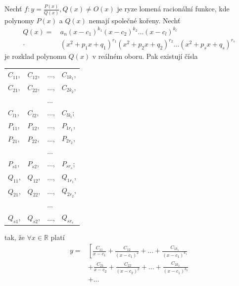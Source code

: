 \begin{veta}\label{rozkladnaparczlomky}
    Nechť $f\colon y=\frac{P(x)}{Q(x)}, Q(x) \ne O(x)$ je ryze lomená
    racionální funkce, kde polynomy $P(x)$ a $Q(x)$ nemají společné
    kořeny. Nechť
    \begin{align*}
        Q(x) = & \, a_n(x-c_1)^{k_1}(x-c_2)^{k_2} \dots
        (x-c_l)^{k_l} \\
        \cdot & \, (x^2+p_1x + q_1)^{r_1}(x^2+p_2x+q_2)
        ^{r_2} \dots (x^2+p_sx+q_s)^{r_s}
    \end{align*}
    je rozklad polynomu $Q(x)$ v reálném oboru. Pak existují čísla
    \begin{center}
        \begin{tabular}{l l l l}
            $C_{11}$, & $C_{12}$, & $\dots$, & $C_{1k_1}$, \\
            $C_{21}$, & $C_{22}$, & $\dots$, & $C_{2k_2}$, \\
            \,        & \,        & $\dots$  & \,          \\
            $C_{l1}$, & $C_{l2}$, & $\dots$, & $C_{lk_l}$; \\
            $P_{11}$, & $P_{12}$, & $\dots$, & $P_{1r_1}$, \\
            $P_{21}$, & $P_{22}$, & $\dots$, & $P_{2r_2}$, \\
            \,        & \,        & $\dots$  & \,          \\
            $P_{s1}$, & $P_{s2}$, & $\dots$, & $P_{sr_s}$; \\
            $Q_{11}$, & $Q_{12}$, & $\dots$, & $Q_{1r_1}$, \\
            $Q_{21}$, & $Q_{22}$, & $\dots$, & $Q_{2r_2}$, \\
            \,        & \,        & $\dots$  & \,          \\
            $Q_{s1}$, & $Q_{s2}$, & $\dots$, & $Q_{sr_s}$
        \end{tabular}
    \end{center}
    tak, že $\forall x \in \mathbb R$ platí
    \begin{align*}
        y = & \left [
              \frac{C_{11}}{x-c_1} + \frac{C_{12}}{(x-c_1)^2} +
              \dots + \frac{C_{1k_1}}{(x-c_1)^{k_1}} \right . \\
          & + \frac{C_{21}}{x-c_2} + \frac{C_{22}}{(x-c_2)^2} +
              \dots + \frac{C_{2k_2}}{(x-c_1)^{k_2}} \\
          & + \dots \\

\end{align*}
\end{veta}
